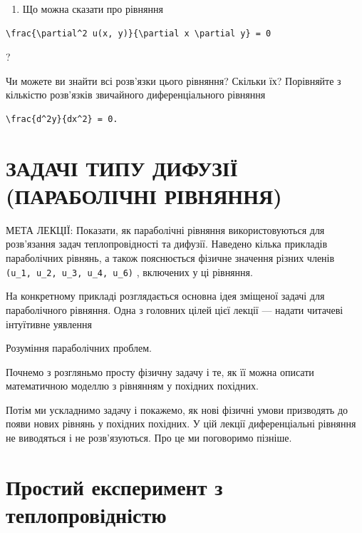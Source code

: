 \documentclass[
  ukrainian,
]{article}
\providecommand{\tightlist}{%
  \setlength{\itemsep}{0pt}\setlength{\parskip}{0pt}}
\begin{document}
\begin{enumerate}
\def\labelenumi{\arabic{enumi}.}
\setcounter{enumi}{4}
\tightlist
\item
  Що можна сказати про рівняння
\end{enumerate}

\begin{verbatim}
\frac{\partial^2 u(x, y)}{\partial x \partial y} = 0
\end{verbatim}

?

Чи можете ви знайти всі розв'язки цього рівняння? Скільки їх? Порівняйте
з кількістю розв'язків звичайного диференціального рівняння

\begin{verbatim}
\frac{d^2y}{dx^2} = 0.
\end{verbatim}

\section{ЗАДАЧІ ТИПУ ДИФУЗІЇ (ПАРАБОЛІЧНІ
РІВНЯННЯ)}\label{ux437ux430ux434ux430ux447ux456-ux442ux438ux43fux443-ux434ux438ux444ux443ux437ux456ux457-ux43fux430ux440ux430ux431ux43eux43bux456ux447ux43dux456-ux440ux456ux432ux43dux44fux43dux43dux44f}

МЕТА ЛЕКЦІЇ: Показати, як параболічні рівняння використовуються для
розв'язання задач теплопровідності та дифузії. Наведено кілька прикладів
параболічних рівнянь, а також пояснюється фізичне значення різних членів
\texttt{(u\_1,\ u\_2,\ u\_3,\ u\_4,\ u\_6)} , включених у ці рівняння.

На конкретному прикладі розглядається основна ідея зміщеної задачі для
параболічного рівняння. Одна з головних цілей цієї лекції --- надати
читачеві інтуїтивне уявлення

Розуміння параболічних проблем.

Почнемо з розгляньмо просту фізичну задачу і те, як її можна описати
математичною моделлю з рівнянням у похідних похідних.

Потім ми ускладнимо задачу і покажемо, як нові фізичні умови призводять
до появи нових рівнянь у похідних похідних. У цій лекції диференціальні
рівняння не виводяться і не розв'язуються. Про це ми поговоримо пізніше.

\section{Простий експеримент з
теплопровідністю}\label{ux43fux440ux43eux441ux442ux438ux439-ux435ux43aux441ux43fux435ux440ux438ux43cux435ux43dux442-ux437-ux442ux435ux43fux43bux43eux43fux440ux43eux432ux456ux434ux43dux456ux441ux442ux44e}
\end{document}

